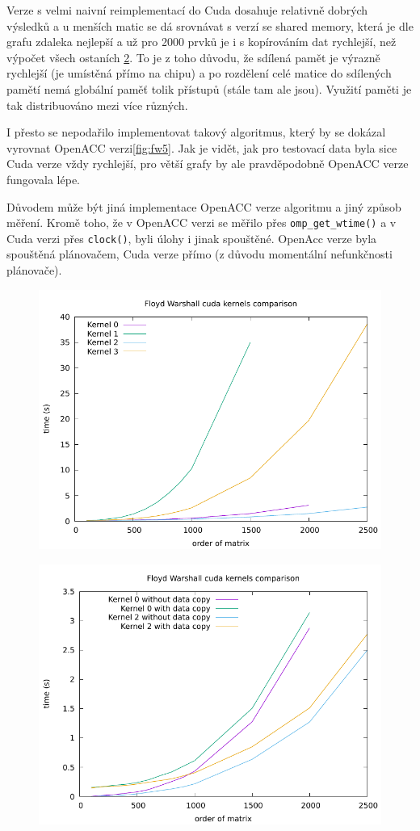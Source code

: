 \documentclass[11pt, fleqn]{article}
\begin{document}
Verze s velmi naivní reimplementací do Cuda dosahuje relativně dobrých výsledků a u menších matic se dá srovnávat s verzí se shared memory, která je dle grafu zdaleka nejlepší a už pro 2000 prvků je i s kopírováním dat rychlejší, než výpočet všech ostaních \ref{fig:fw4}. To je z toho důvodu, že sdílená pamět je výrazně rychlejší (je umístěná přímo na chipu) a po rozdělení celé matice do sdílených pamětí nemá globální paměť tolik přístupů (stále tam ale jsou). Využití paměti je tak distribuováno mezi více různých.

I přesto se nepodařilo implementovat takový algoritmus, který by se dokázal vyrovnat OpenACC verzi\ref{fig:fw5}. Jak je vidět, jak pro testovací data byla sice Cuda verze vždy rychlejší, pro větší grafy by ale pravděpodobně OpenACC verze fungovala lépe.

Důvodem může být jiná implementace OpenACC verze algoritmu a jiný způsob měření. Kromě toho, že v OpenACC verzi se měřilo přes \lstinline{omp_get_wtime()} a v Cuda verzi přes \lstinline{clock()}, byli úlohy i jinak spouštěné. OpenAcc verze byla spouštěná plánovačem, Cuda verze přímo (z důvodu momentální nefunkčnosti plánovače).

\begin{figure}
  \centering
  \includegraphics[width=.7\linewidth]{../results/FW_Cuda.pdf}
  \label{fig:fw3}
\end{figure}

\begin{figure}
  \centering
  \includegraphics[width=.7\linewidth]{../results/FW_Cuda2.pdf}
  \label{fig:fw4}
\end{figure}
\end{document}
